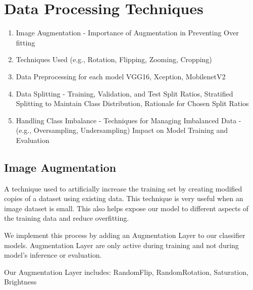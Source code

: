 \section{Data Processing Techniques}

\begin{enumerate}
    \item Image Augmentation - Importance of Augmentation in Preventing Over fitting
    \item Techniques Used (e.g., Rotation, Flipping, Zooming, Cropping)
    \item Data Preprocessing for each model VGG16, Xception, MobilenetV2
    \item Data Splitting - Training, Validation, and Test Split Ratios, Stratified Splitting to Maintain Class Distribution, Rationale for Chosen Split Ratios
    \item Handling Class Imbalance - Techniques for Managing Imbalanced Data - (e.g., Oversampling, Undersampling) Impact on Model Training and Evaluation
\end{enumerate}
\par

\subsection{Image Augmentation}
A technique used to artificially increase the training set by creating modified copies of a dataset using existing data. This technique is very useful when an image dataset is small. This also helps expose our model to different aspects of the training data and reduce overfitting. \par \vspace{1em}
We implement this process by adding an Augmentation Layer to our classifier models.
Augmentation Layer are only active during training and not during model’s inference or evaluation.\par \vspace{1em}
Our Augmentation Layer includes: RandomFlip, RandomRotation, Saturation, Brightness

